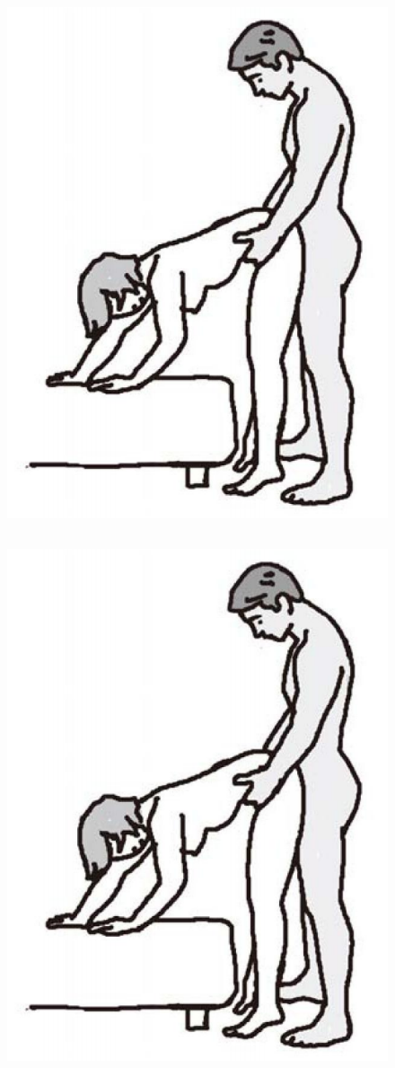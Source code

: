 \documentclass[12pt,UTF8]{ctexbook}
\begin{document}
\begin{figure}[htbp]
\centering
\includegraphics[width=0.7\linewidth]{tw12}
\caption{}
\label{fig:1}
\end{figure}\subsection{}

\begin{figure}[htbp]
\centering
\includegraphics[width=0.7\linewidth]{tw12}
\caption{}
\label{fig:1}
\end{figure}\subsection{}
\end{document}
